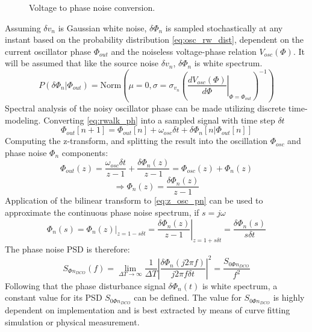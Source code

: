 		\begin{figure}[htb!]
			\center
			\caption{Voltage to phase noise conversion.}
			\label{fig:aperture_noise}
		\end{figure}
		\FloatBarrier
		  Assuming $\delta v_n$ is Gaussian white noise, $\delta\Phi_{n}$ is sampled stochastically at any instant based on the probability distribution \ref{eq:osc_rw_dist}, dependent on the current oscillator phase $\Phi_{out}$ and the noiseless voltage-phase relation $V_{osc}(\Phi)$. It will be assumed that like the source noise $\delta v_n$, $\delta\Phi_{n}$ is white spectrum.
		 \begin{equation}
		 	P(\delta\Phi_{n}|\Phi_{out}) = \text{Norm}\left(\mu=0, \sigma=\sigma_{v_n}\left(\left.\frac{dV_{osc}(\Phi)}{d\Phi}\right\vert_{\Phi=\Phi_{out}}\right)^{-1}\right) \label{eq:osc_rw_dist}
		 \end{equation} 
		Spectral analysis of the noisy oscillator phase can be made utilizing discrete time-modeling. Converting \ref{eq:rwalk_ph} into a sampled signal with time step $\delta t$ 
		\begin{equation}
			\Phi_{out}[n+1] = \Phi_{out}[n] + \omega_{osc}\delta t + \delta\Phi_n[n|\Phi_{out}[n]]
		\end{equation}
		Computing the z-transform, and splitting the result into the oscillation $\Phi_{osc}$ and phase noise $\Phi_{n}$ components:
		\begin{equation}
			\Phi_{out}(z) = \frac{\omega_{osc}\delta t}{z-1} + \frac{\delta\Phi_n(z)}{z-1} = \Phi_{osc}(z) + \Phi_{n}(z)
		\end{equation}
		\begin{equation}
			\Rightarrow \Phi_{n}(z) = \frac{\delta\Phi_n(z)}{z-1} \label{eq:z_osc_pn}
		\end{equation}
		Application of the bilinear transform to \ref{eq:z_osc_pn} can be used to approximate the continuous phase noise spectrum, if $s=j\omega$
		\begin{equation}
			\Phi_{n}(s) = \left.\Phi_{n}(z)\right\vert_{z=1-s\delta t} = \left.\frac{\delta\Phi_n(z)}{z-1}\right\vert_{z=1+s\delta t} = \frac{\delta\Phi_n(s)}{s\delta t}
		\end{equation}
		The phase noise PSD is therefore:
		\begin{equation}
			S_{\Phi n_{DCO}}(f)= \lim_{\Delta T\rightarrow\infty}\frac{1}{\Delta T}\left|\frac{\delta\Phi_n(j2\pi f)}{j2\pi f \delta t}\right|^2  =  \frac{S_{0\Phi n_{DCO}}}{f^2}
		\end{equation}
		Following that the phase disturbance signal $\delta\Phi_{n}(t)$ is white spectrum, a constant value for its PSD $S_{0\Phi n_{DCO}}$ can be defined. The value for $S_{0\Phi n_{DCO}}$ is highly dependent on implementation and is best extracted by means of curve fitting simulation or physical measurement.
	
